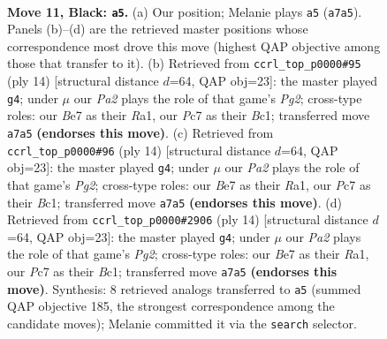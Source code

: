 \documentclass[11pt]{article}
\begin{document}
\clearpage

\begin{figure}[p]\centering
\begin{subfigure}{0.46\textwidth}\centering
\resizebox{\linewidth}{!}{%
\newchessgame
\chessboard[
  setfen={r1bqr1k1/ppp1bp1p/2n1p1p1/3n4/2NP4/4PBP1/PP3P1P/RNBQR1K1 b - - 4 11},
  showmover=false,
  pgfstyle=straightmove, color=movearrow, markmove={a7-a5}
]}
\caption{}
\end{subfigure}\hfill
\begin{subfigure}{0.46\textwidth}\centering
\resizebox{\linewidth}{!}{%
\newchessgame
\chessboard[
  setfen={rnb1kb1r/1p3ppp/pq1ppn2/8/4P3/1NN2P2/PPP3PP/R1BQKB1R w KQkq - 0 8},
  showmover=false,
  pgfstyle=straightmove, color=movearrow, markmove={g2-g4}
]}
\caption{}
\end{subfigure}
\\[4pt]
\begin{subfigure}{0.46\textwidth}\centering
\resizebox{\linewidth}{!}{%
\newchessgame
\chessboard[
  setfen={rnb1kb1r/1p3ppp/pq1ppn2/8/4P3/1NN2P2/PPP3PP/R1BQKB1R w KQkq - 0 8},
  showmover=false,
  pgfstyle=straightmove, color=movearrow, markmove={g2-g4}
]}
\caption{}
\end{subfigure}\hfill
\begin{subfigure}{0.46\textwidth}\centering
\resizebox{\linewidth}{!}{%
\newchessgame
\chessboard[
  setfen={rnb1kb1r/1p3ppp/pq1ppn2/8/4P3/1NN2P2/PPP3PP/R1BQKB1R w KQkq - 0 8},
  showmover=false,
  pgfstyle=straightmove, color=movearrow, markmove={g2-g4}
]}
\caption{}
\end{subfigure}
\caption{\textbf{Move 11, Black: \texttt{a5}.} (a) Our position; Melanie plays \texttt{a5} (\texttt{a7a5}). Panels (b)--(d) are the retrieved master positions whose correspondence most drove this move (highest QAP objective among those that transfer to it). (b) Retrieved from \texttt{ccrl\_top\_p0000\#95} (ply 14) [structural distance $d$=64, QAP obj=23]: the master played \texttt{g4}; under $\mu$ our \emph{Pa2} plays the role of that game's \emph{Pg2}; cross-type roles: our \emph{B}e7 as their \emph{R}a1, our \emph{P}c7 as their \emph{B}c1; transferred move \texttt{a7a5} \textbf{(endorses this move)}. (c) Retrieved from \texttt{ccrl\_top\_p0000\#96} (ply 14) [structural distance $d$=64, QAP obj=23]: the master played \texttt{g4}; under $\mu$ our \emph{Pa2} plays the role of that game's \emph{Pg2}; cross-type roles: our \emph{B}e7 as their \emph{R}a1, our \emph{P}c7 as their \emph{B}c1; transferred move \texttt{a7a5} \textbf{(endorses this move)}. (d) Retrieved from \texttt{ccrl\_top\_p0000\#2906} (ply 14) [structural distance $d$=64, QAP obj=23]: the master played \texttt{g4}; under $\mu$ our \emph{Pa2} plays the role of that game's \emph{Pg2}; cross-type roles: our \emph{B}e7 as their \emph{R}a1, our \emph{P}c7 as their \emph{B}c1; transferred move \texttt{a7a5} \textbf{(endorses this move)}. Synthesis: 8 retrieved analogs transferred to \texttt{a5} (summed QAP objective 185, the strongest correspondence among the candidate moves); Melanie committed it via the \texttt{search} selector.}
\label{fig:thought-m21}
\end{figure}
\end{document}
